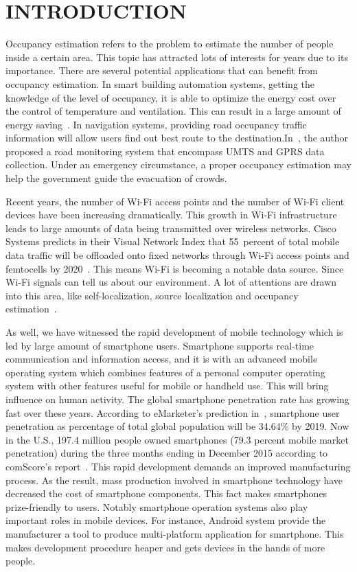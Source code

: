 \chapter[INTRODUCTION]{INTRODUCTION}
Occupancy estimation refers to the problem to estimate the number of people inside a certain area. 
This topic has attracted lots of interests for years due to its importance.
There are several potential applications that can benefit from occupancy estimation.
In smart building automation systems, getting the knowledge of the level of occupancy, it is able to optimize the energy cost over the control of temperature and ventilation.
This can result in a large amount of energy saving~\cite{Nguyen2013244,Balaji:2013:SOB:2517351.2517370}.
In navigation systems, providing road occupancy traffic information will allow users find out best route to the destination.In~\cite{5073548}, the author proposed a road monitoring system that encompass UMTS and GPRS data collection.
Under an emergency circumstance, a proper occupancy estimation may help the government guide the evacuation of crowds. 

Recent years, the number of Wi-Fi access points and the number of Wi-Fi client devices have been increasing dramatically. This growth in Wi-Fi infrastructure leads to large amounts of data being transmitted over wireless networks. Cisco Systems predicts in their Visual Network Index that 55~percent of total mobile data traffic will be offloaded onto fixed networks through Wi-Fi access points and femtocells by 2020~\cite{CiscoVNI2016}. This means Wi-Fi is becoming a notable data source. Since Wi-Fi signals can tell us about our environment. A lot of attentions are drawn into this area, like self-localization, source localization and occupancy estimation~\cite{2461394,6197192}.

As well, we have witnessed the rapid development of mobile technology which is led by large amount of smartphone users. Smartphone supports real-time communication and information access, and it is with an advanced mobile operating system which combines features of a personal computer operating system with other features useful for mobile or handheld use. This will bring influence on human activity. The global smartphone penetration rate has growing fast over these years. According to eMarketer's prediction in~\cite{emarketer}, smartphone user penetration as percentage of total global population will be 34.64\% by 2019. Now in the U.S., 197.4 million people owned smartphones (79.3 percent mobile market penetration) during the three months ending in December 2015 according to comScore's report~\cite{comscore}. This rapid development demands an improved manufacturing process. As the result, mass production involved in smartphone technology have decreased the cost of smartphone components. This fact makes smartphones prize-friendly to users. Notably smartphone operation systems also play important roles in mobile devices. For instance,  Android system provide the manufacturer a tool to produce multi-platform application for smartphone. This makes development procedure heaper and gets devices in the hands of more people.

